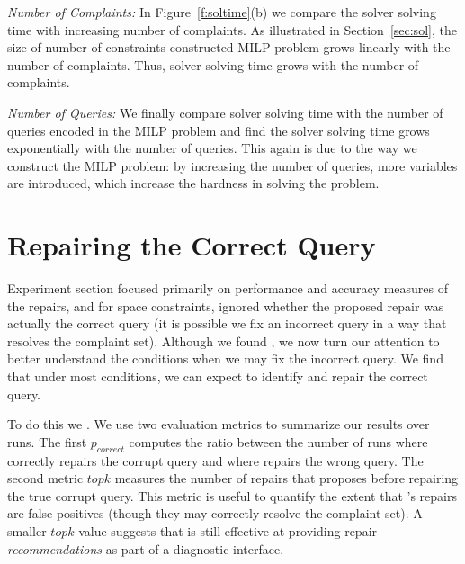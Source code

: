 \smallskip
\emph{Number of Complaints: } In Figure~\ref{f:soltime}(b) we compare the solver solving 
time with increasing number of complaints. As illustrated in Section~\ref{sec:sol}, 
the size of number of constraints constructed MILP problem grows linearly with the number of complaints. Thus, solver solving time grows with the number of complaints. 


\smallskip
\emph{Number of Queries: }
We finally compare solver solving time with the number of queries encoded in the MILP problem and find the solver solving time grows exponentially with the number of queries. This again is due to the way we construct the MILP problem: by increasing the number of queries, more variables are introduced, which increase the hardness in solving the problem. 









\section{Repairing the Correct Query}
\label{app:index}

Experiment section focused primarily on performance and accuracy measures of the repairs, and for space constraints, ignored 
whether the proposed repair was actually the correct query (it is possible we fix an incorrect query in a way that resolves the complaint set).
Although we found , we now turn our attention to better understand 
the conditions when we may fix the incorrect query.   We find that under most conditions, we can expect to identify and repair the correct query.


To do this we .  We use two evaluation metrics to summarize our results over  runs.
The first $p_{correct}$ computes the ratio between the number of runs where \sys correctly repairs the corrupt query and where \sys
repairs the wrong query.  The second metric $topk$ measures the number of repairs that \sys proposes before repairing the true corrupt query.
This metric is useful to quantify the extent that \sys's repairs are false positives (though they may correctly resolve the complaint set).
A smaller $topk$ value suggests that \sys is still effective at providing repair \emph{recommendations} as part of a diagnostic interface.


